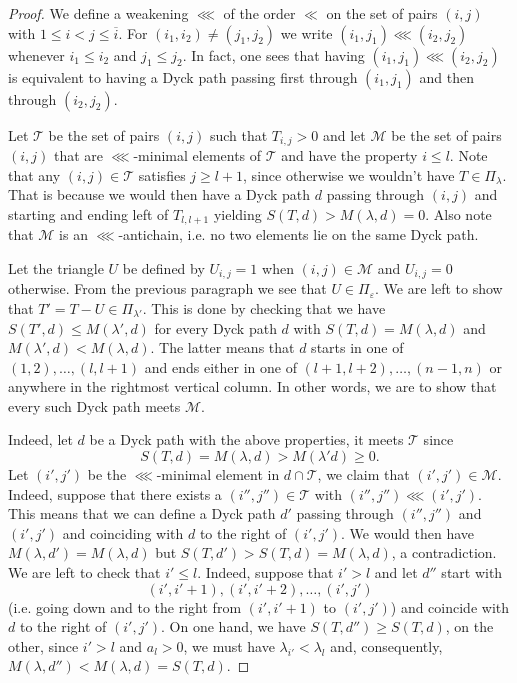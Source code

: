 \documentclass[10pt,a4paper]{article}
\theoremstyle{remark}\newtheorem{rema}[theo]{Remark}
\newcommand{\la}{\lambda}
\begin{document}
\begin{proof}
We define a weakening $\lll$ of the order $\ll$ on the set of pairs $(i,j)$ with $1\le i<j\le\overline i$. For $(i_1,i_2)\neq(j_1,j_2)$ we write $(i_1,j_1)\lll(i_2,j_2)$ whenever $i_1\le i_2$ and $j_1\le j_2$. In fact, one sees that having $(i_1,j_1)\lll(i_2,j_2)$ is equivalent to having a Dyck path passing first through $(i_1,j_1)$ and then through $(i_2,j_2)$.

Let $\mathcal T$ be the set of pairs $(i,j)$ such that $T_{i,j}>0$ and let $\mathcal M$ be the set of pairs $(i,j)$ that are $\lll$-minimal elements of $\mathcal T$ and have the property $i\le l$. Note that any $(i,j)\in\mathcal T$ satisfies $j\ge l+1$, since otherwise we wouldn't have $T\in\Pi_\lambda$. That is because we would then have a Dyck path $d$ passing through $(i,j)$ and starting and ending left of $T_{l,l+1}$ yielding $S(T,d)>M(\la,d)=0$. Also note that $\mathcal M$ is an $\lll$-antichain, i.e. no two elements lie on the same Dyck path.

Let the triangle $U$ be defined by $U_{i,j}=1$ when $(i,j)\in\mathcal M$ and $U_{i,j}=0$ otherwise. From the previous paragraph we see that $U\in\Pi_\varepsilon$. We are left to show that $T'=T-U\in\Pi_{\lambda'}$. This is done by checking that we have $S(T',d)\le M(\la',d)$ for every Dyck path $d$ with $S(T,d)=M(\la,d)$ and $M(\la',d)<M(\la,d)$. The latter means that $d$ starts in one of $(1,2),\dots,(l,l+1)$ and ends either in one of $(l+1,l+2),\dots,(n-1,n)$ or anywhere in the rightmost vertical column. In other words, we are to show that every such Dyck path meets $\mathcal M$.

Indeed, let $d$ be a Dyck path with the above properties, it meets $\mathcal T$ since
\[
S(T,d)=M(\la,d)>M(\la'd)\ge 0.
\]
Let $(i',j')$ be the $\lll$-minimal element in $d\cap\mathcal T$, we claim that $(i',j')\in\mathcal M$. Indeed, suppose that there exists a $(i'',j'')\in\mathcal T$ with $(i'',j'')\lll(i',j')$. This means that we can define a Dyck path $d'$ passing through $(i'',j'')$ and $(i',j')$ and coinciding with $d$ to the right of $(i',j')$. We would then have $M(\la,d')=M(\la,d)$ but $S(T,d')>S(T,d)=M(\la,d)$, a contradiction. We are left to check that $i'\le l$. Indeed, suppose that $i'>l$ and let $d''$ start with
\[
(i',i'+1),(i',i'+2),\dots,(i',j')
\]
(i.e. going down and to the right from $(i',i'+1)$ to $(i',j')$) and coincide with $d$ to the right of $(i',j')$. On one hand, we have $S(T,d'')\ge S(T,d)$, on the other, since $i'>l$ and $a_l>0$, we must have $\lambda_{i'}<\la_l$ and, consequently, $M(\la,d'')<M(\la,d)=S(T,d)$.
\end{proof}
\end{document}
